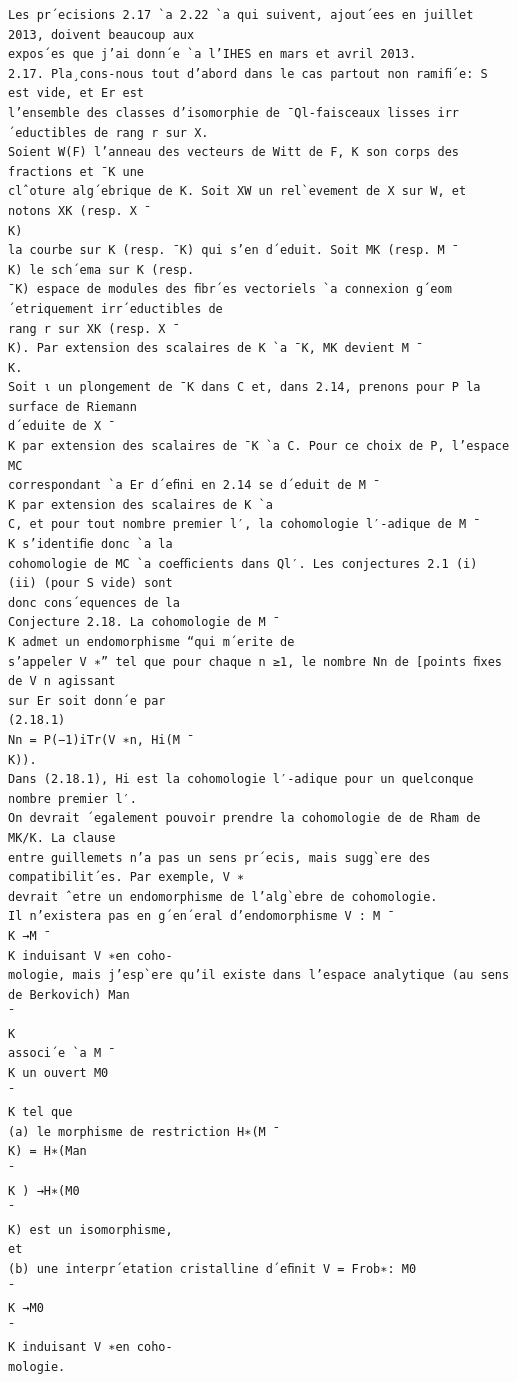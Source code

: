 \documentclass[11pt]{article}
\begin{document}
\begin{Verbatim}[breaklines=true,fontsize=\small]
Les pr´ecisions 2.17 `a 2.22 `a qui suivent, ajout´ees en juillet 2013, doivent beaucoup aux
expos´es que j’ai donn´e `a l’IHES en mars et avril 2013.
2.17. Pla¸cons-nous tout d’abord dans le cas partout non ramiﬁ´e: S est vide, et Er est
l’ensemble des classes d’isomorphie de ¯Ql-faisceaux lisses irr´eductibles de rang r sur X.
Soient W(F) l’anneau des vecteurs de Witt de F, K son corps des fractions et ¯K une
clˆoture alg´ebrique de K. Soit XW un rel`evement de X sur W, et notons XK (resp. X ¯
K)
la courbe sur K (resp. ¯K) qui s’en d´eduit. Soit MK (resp. M ¯
K) le sch´ema sur K (resp.
¯K) espace de modules des ﬁbr´es vectoriels `a connexion g´eom´etriquement irr´eductibles de
rang r sur XK (resp. X ¯
K). Par extension des scalaires de K `a ¯K, MK devient M ¯
K.
Soit ι un plongement de ¯K dans C et, dans 2.14, prenons pour P la surface de Riemann
d´eduite de X ¯
K par extension des scalaires de ¯K `a C. Pour ce choix de P, l’espace MC
correspondant `a Er d´eﬁni en 2.14 se d´eduit de M ¯
K par extension des scalaires de K `a
C, et pour tout nombre premier l′, la cohomologie l′-adique de M ¯
K s’identiﬁe donc `a la
cohomologie de MC `a coeﬃcients dans Ql′. Les conjectures 2.1 (i) (ii) (pour S vide) sont
donc cons´equences de la
Conjecture 2.18. La cohomologie de M ¯
K admet un endomorphisme “qui m´erite de
s’appeler V ∗” tel que pour chaque n ≥1, le nombre Nn de [points ﬁxes de V n agissant
sur Er soit donn´e par
(2.18.1)
Nn = P(−1)iTr(V ∗n, Hi(M ¯
K)).
Dans (2.18.1), Hi est la cohomologie l′-adique pour un quelconque nombre premier l′.
On devrait ´egalement pouvoir prendre la cohomologie de de Rham de MK/K. La clause
entre guillemets n’a pas un sens pr´ecis, mais sugg`ere des compatibilit´es. Par exemple, V ∗
devrait ˆetre un endomorphisme de l’alg`ebre de cohomologie.
Il n’existera pas en g´en´eral d’endomorphisme V : M ¯
K →M ¯
K induisant V ∗en coho-
mologie, mais j’esp`ere qu’il existe dans l’espace analytique (au sens de Berkovich) Man
¯
K
associ´e `a M ¯
K un ouvert M0
¯
K tel que
(a) le morphisme de restriction H∗(M ¯
K) = H∗(Man
¯
K ) →H∗(M0
¯
K) est un isomorphisme,
et
(b) une interpr´etation cristalline d´eﬁnit V = Frob∗: M0
¯
K →M0
¯
K induisant V ∗en coho-
mologie.


\end{Verbatim}
\end{document}
